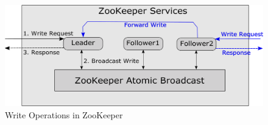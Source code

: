 \documentclass[a4paper,UKenglish]{oasics-v2016}
\begin{document}
%
%

\begin{figure}[h]
	\centering
	\includegraphics[scale=0.11]{pics/ZKServices.pdf}
	\caption{Write Operations in ZooKeeper}
	\label{ZooKeeper Service}
\end{figure}


\end{document}
